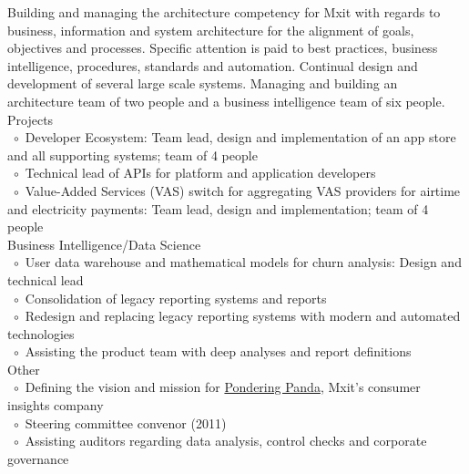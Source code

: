 \documentclass[10pt,a4paper,final]{columncv}
\newcommand{\cvitembullet}{~$\circ$~}
\newcommand{\cvitempbullet}{\phantom{\cvitembullet}}
\begin{document}
\begin{cvenv}
         {Building and managing the architecture competency for Mxit with regards to 
         business, information and system architecture for the alignment of goals, 
         objectives and processes. Specific attention is paid to best practices, business 
         intelligence, procedures, standards and automation. Continual design and 
         development of several large scale systems. Managing and building an architecture
         team of two people and a business intelligence team of six people.}
         {Projects \\
         \cvitembullet Developer Ecosystem: Team lead, design and implementation 
         \cvitempbullet of an app store and all supporting systems; team of 4 people \\
         \cvitembullet Technical lead of APIs for platform and application developers \\
         \cvitembullet Value-Added Services (VAS) switch for aggregating VAS providers 
         \cvitempbullet for airtime and electricity payments: Team lead, design and 
         \cvitempbullet implementation; team of 4 people \\
         Business Intelligence/Data Science \\
         \cvitembullet User data warehouse and mathematical models for churn analysis: 
         \cvitempbullet Design and technical lead \\
         \cvitembullet Consolidation of legacy reporting systems and reports \\
         \cvitembullet Redesign and replacing legacy reporting systems with modern and 
         \cvitempbullet automated technologies \\
         \cvitembullet Assisting the product team with deep analyses and report 
         \cvitempbullet definitions \\
         Other \\
         \cvitembullet Defining the vision and mission for \href{http://www.ponderingpanda.com/}{Pondering Panda}, Mxit's
         \cvitempbullet consumer insights company \\
         \cvitembullet Steering committee convenor (2011) \\
         \cvitembullet Assisting auditors regarding data analysis, control checks and 
         \cvitempbullet corporate governance \\
}
\end{cvenv}
\end{document}
